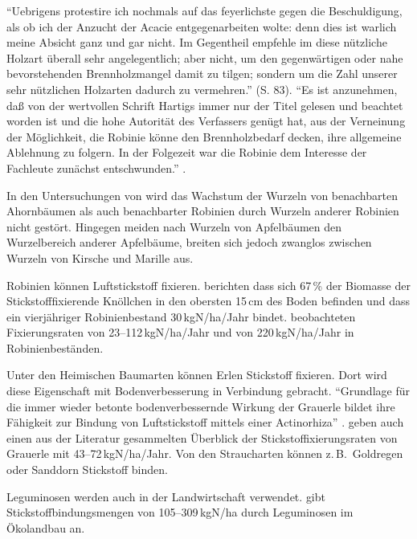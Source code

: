 \documentclass[twocolumn]{scrartcl}
\begin{document}
\enquote{Uebrigens protestire ich nochmals auf das feyerlichste gegen
  die Beschuldigung, als ob ich der Anzucht der Acacie
  entgegenarbeiten wolte: denn dies ist warlich meine Absicht ganz und
  gar nicht. Im Gegentheil empfehle im diese nützliche Holzart
  überall sehr angelegentlich; aber nicht, um den gegenwärtigen oder
  nahe bevorstehenden Brennholzmangel damit zu tilgen; sondern um die
  Zahl unserer sehr nützlichen Holzarten dadurch zu vermehren.}
(S. 83).
\enquote{Es ist anzunehmen, daß von der wertvollen Schrift Hartigs
  immer nur der Titel gelesen und beachtet worden ist und die hohe
  Autorität des Verfassers genügt hat, aus der Verneinung der
  Möglichkeit, die Robinie könne den Brennholzbedarf decken, ihre
  allgemeine Ablehnung zu folgern. In der Folgezeit war die Robinie
  dem Interesse der Fachleute zunächst entschwunden.}
\citep{erteld1952robinieErtrag}.

In den Untersuchungen von
\citet[S.~150--160]{scamoni1952robinieWurzeln} wird das Wachstum der
Wurzeln von benachbarten Ahornbäumen als auch benachbarter Robinien
durch Wurzeln anderer Robinien nicht gestört. Hingegen meiden nach
\citet[S.~53]{kolesnikov1971wurzeln} Wurzeln von Apfelbäumen den
Wurzelbereich anderer Apfelbäume, breiten sich jedoch zwanglos
zwischen Wurzeln von Kirsche und Marille aus.

Robinien können Luftstickstoff fixieren.
\citet{boring1984robinieN} berichten dass sich 67\,\% der Biomasse der
Stickstofffixierende Knöllchen in den obersten 15\,cm des Boden befinden
und dass ein vierjähriger Robinienbestand 30\,kgN/ha/Jahr bindet.
\citet{noh2009robinieN} beobachteten
Fixierungsraten von 23--112\,kgN/ha/Jahr und \citet{danso1995robinieN}
von 220\,kgN/ha/Jahr in Robinienbeständen.

Unter den Heimischen Baumarten können Erlen Stickstoff fixieren. Dort
wird diese Eigenschaft mit Bodenverbesserung in Verbindung
gebracht. \enquote{Grundlage für die immer wieder betonte bodenverbessernde
Wirkung der Grauerle bildet ihre Fähigkeit zur Bindung von
Luftstickstoff mittels einer Actinorhiza}
\citep{schuett2014alnusIncarna}. \citet{schuett2014alnusIncarna} geben
auch einen aus der Literatur gesammelten Überblick der
Stickstoffixierungsraten von Grauerle mit 43--72\,kgN/ha/Jahr.
Von den Straucharten können z.\,B.\ Goldregen oder Sanddorn Stickstoff binden.

Leguminosen werden auch in der Landwirtschaft verwendet.
\citet{kolbe2008stickstoff} gibt Stickstoffbindungsmengen von
105--309\,kgN/ha durch Leguminosen im Ökolandbau an.
\end{document}

